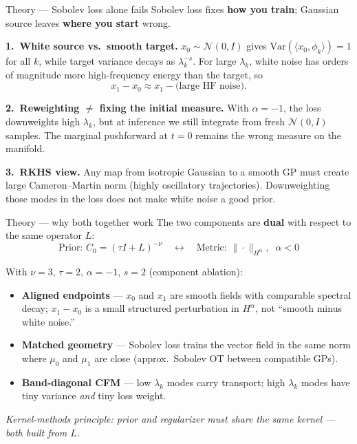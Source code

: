 \documentclass[aspectratio=169,11pt]{beamer}
\begin{document}
\begin{frame}{Theory --- Sobolev loss alone fails}
  \small
  Sobolev loss fixes \textbf{how you train}; Gaussian source leaves \textbf{where you start} wrong.

  \vspace{0.35em}
  \textbf{1.\ White source vs.\ smooth target.}\quad
  $x_0 \sim \mathcal{N}(0,I)$ gives $\mathrm{Var}(\langle x_0, \phi_k\rangle) = 1$ for all $k$, while target variance decays as $\lambda_k^{-s}$. For large $\lambda_k$, white noise has orders of magnitude more high-frequency energy than the target, so
  \[
    x_1 - x_0 \approx x_1 - \text{(large HF noise)} .
  \]

  \vspace{0.35em}
  \textbf{2.\ Reweighting $\neq$ fixing the initial measure.}\quad
  With $\alpha = -1$, the loss downweights high $\lambda_k$, but at inference we still integrate from fresh $\mathcal{N}(0,I)$ samples. The marginal pushforward at $t{=}0$ remains the wrong measure on the manifold.

  \vspace{0.35em}
  \textbf{3.\ RKHS view.}\quad
  Any map from isotropic Gaussian to a smooth GP must create large Cameron--Martin norm (highly oscillatory trajectories). Downweighting those modes in the loss does not make white noise a good prior.
\end{frame}

\begin{frame}{Theory --- why both together work}
  \small
  The two components are \textbf{dual} with respect to the same operator $L$:
  \[
    \boxed{
      \text{Prior: } C_0 = (\tau I + L)^{-\nu}
      \quad\longleftrightarrow\quad
      \text{Metric: } \|\cdot\|_{H^\alpha},\;\; \alpha < 0
    }
  \]

  \vspace{0.35em}
  With $\nu{=}3$, $\tau{=}2$, $\alpha{=}{-}1$, $s{=}2$ (component ablation):
  \begin{itemize}\setlength{\itemsep}{0.12em}
    \item \textbf{Aligned endpoints} --- $x_0$ and $x_1$ are smooth fields with comparable spectral decay; $x_1 - x_0$ is a small structured perturbation in $H^\alpha$, not ``smooth minus white noise.''
    \item \textbf{Matched geometry} --- Sobolev loss trains the vector field in the same norm where $\mu_0$ and $\mu_1$ are close (approx.\ Sobolev OT between compatible GPs).
    \item \textbf{Band-diagonal CFM} --- low $\lambda_k$ modes carry transport; high $\lambda_k$ modes have tiny variance \emph{and} tiny loss weight.
  \end{itemize}

  \vspace{0.25em}
  \textit{Kernel-methods principle: prior and regularizer must share the same kernel --- both built from $L$.}
\end{frame}
\end{document}
